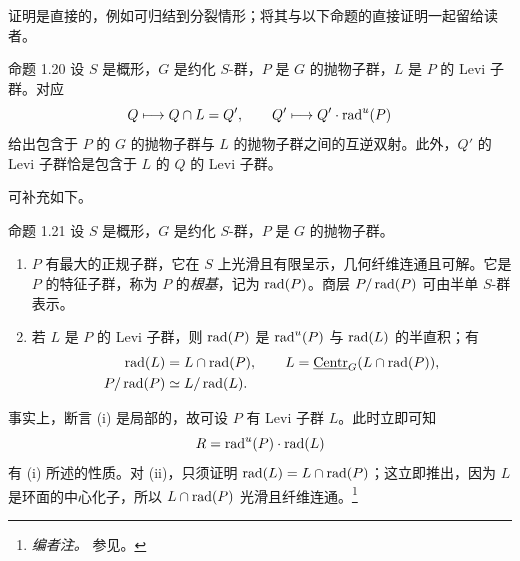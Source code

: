 证明是直接的，例如可归结到分裂情形；将其与以下命题的直接证明一起留给读者。
\begin{sgastatement}{命题 1.20}
设 \(S\) 是概形，\(G\) 是约化 \(S\)-群，\(P\) 是 \(G\) 的抛物子群，\(L\) 是 \(P\) 的 Levi 子群。对应
\[
 Q\longmapsto Q\cap L=Q',
 \qquad
 Q'\longmapsto Q'\cdot\operatorname{rad}^u(P)
\]
给出包含于 \(P\) 的 \(G\) 的抛物子群与 \(L\) 的抛物子群之间的互逆双射。此外，\(Q'\) 的 Levi 子群恰是包含于 \(L\) 的 \(Q\) 的 Levi 子群。
\end{sgastatement}

 可补充如下。
\begin{sgastatement}{命题 1.21}
设 \(S\) 是概形，\(G\) 是约化 \(S\)-群，\(P\) 是 \(G\) 的抛物子群。
\begin{enumerate}[label=\textup{(\roman*)}]
\item \(P\) 有最大的正规子群，它在 \(S\) 上光滑且有限呈示，几何纤维连通且可解。它是 \(P\) 的特征子群，称为 \(P\) 的\emph{根基}，记为 \(\operatorname{rad}(P)\)。商层 \(P/\operatorname{rad}(P)\) 可由半单 \(S\)-群表示。
\item 若 \(L\) 是 \(P\) 的 Levi 子群，则 \(\operatorname{rad}(P)\) 是 \(\operatorname{rad}^u(P)\) 与 \(\operatorname{rad}(L)\) 的半直积；有
\[
\begin{aligned}
 \operatorname{rad}(L)&=L\cap\operatorname{rad}(P),
 \qquad
 L=\underline{\operatorname{Centr}}_G(L\cap\operatorname{rad}(P)),\\
 P/\operatorname{rad}(P)&\simeq L/\operatorname{rad}(L).
\end{aligned}
\]
\end{enumerate}
\end{sgastatement}

事实上，断言 (i) 是局部的，故可设 \(P\) 有 Levi 子群 \(L\)。此时立即可知
\[
 R=\operatorname{rad}^u(P)\cdot\operatorname{rad}(L)
\]
有 (i) 所述的性质。对 (ii)，只须证明 \(\operatorname{rad}(L)=L\cap\operatorname{rad}(P)\)；这立即推出，因为 \(L\) 是环面的中心化子，所以 \(L\cap\operatorname{rad}(P)\) 光滑且纤维连通。\footnote{\emph{编者注。} 参见。}


